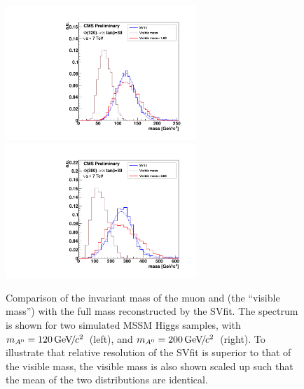 \begin{figure}[t]
\begin{center}
\includegraphics*[width=72mm]{svfit_chapter/figures/sv_fit_approval_plots/sv_vs_vis_A120.pdf}
\includegraphics*[width=72mm]{svfit_chapter/figures/sv_fit_approval_plots/sv_vs_vis_A300.pdf}
\caption[Comparison of SVfit with the visible mass observable]{Comparison of the
invariant mass of the muon and \tjet (the ``visible mass'') with the full \TT
mass reconstructed by the SVfit. The spectrum is shown for two simulated MSSM
Higgs samples, with $m_{A^0} = 120{\,\text{Ge\hspace{-.08em}V\hspace{-0.16em}/\hspace{-0.08em}}c^\text{2}}$~(left), and $m_{A^0} = 200{\,\text{Ge\hspace{-.08em}V\hspace{-0.16em}/\hspace{-0.08em}}c^\text{2}}$~(right).  To
illustrate that relative resolution of the SVfit is superior to that of the
visible mass, the visible mass is also shown scaled up such that the mean of the
two distributions are identical.} \label{fig:SVversusVis}
\end{center}
\end{figure} 

\ifx\master\undefined\fi
